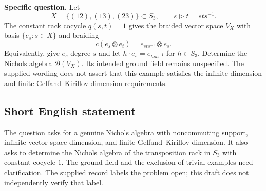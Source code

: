 \documentclass[11pt]{article}
\begin{document}
\textbf{Specific question.} Let
\[
X=\{(12),(13),(23)\}\subset S_3,
\qquad s\triangleright t=sts^{-1}.
\]
The constant rack cocycle \(q(s,t)=1\) gives the braided vector space \(V_X\) with basis \(\{e_s:s\in X\}\) and braiding
\[
c(e_s\otimes e_t)=e_{sts^{-1}}\otimes e_s.
\]
Equivalently, give \(e_s\) degree \(s\) and let \(h\cdot e_s=e_{hsh^{-1}}\) for \(h\in S_3\). Determine the Nichols algebra \(\mathcal B(V_X)\). Its intended ground field remains unspecified. The supplied wording does not assert that this example satisfies the infinite-dimension and finite-Gelfand--Kirillov-dimension requirements.
\subsection{Short English statement}
The question asks for a genuine Nichols algebra with noncommuting support, infinite vector-space dimension, and finite Gelfand--Kirillov dimension. It also asks to determine the Nichols algebra of the transposition rack in \(S_3\) with constant cocycle \(1\). The ground field and the exclusion of trivial examples need clarification. The supplied record labels the problem open; this draft does not independently verify that label.
\end{document}
